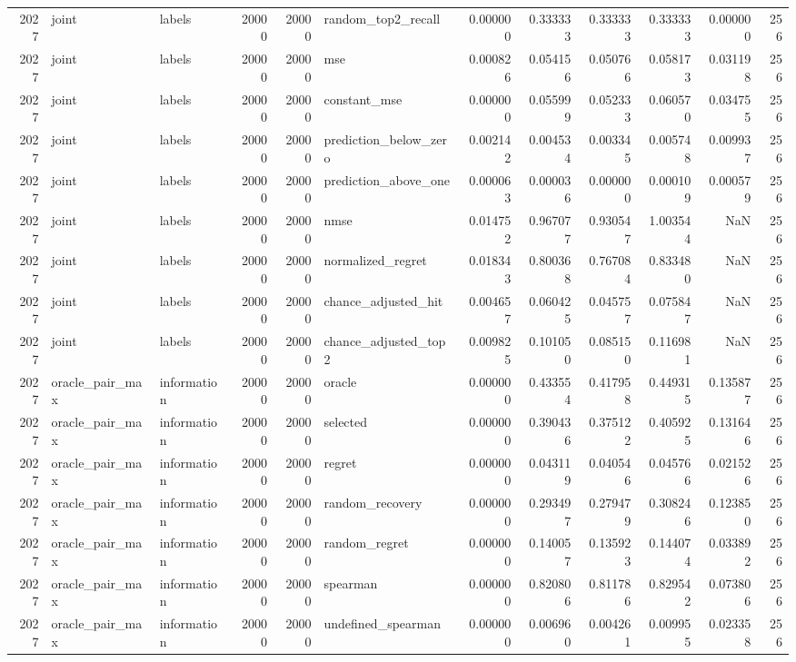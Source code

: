 \begin{tabular}{rllrrlrrrrrr}
2027 & joint & labels & 20000 & 20000 & random_top2_recall & 0.000000 & 0.333333 & 0.333333 & 0.333333 & 0.000000 & 256 \\
2027 & joint & labels & 20000 & 20000 & mse & 0.000826 & 0.054156 & 0.050766 & 0.058173 & 0.031198 & 256 \\
2027 & joint & labels & 20000 & 20000 & constant_mse & 0.000000 & 0.055999 & 0.052333 & 0.060570 & 0.034755 & 256 \\
2027 & joint & labels & 20000 & 20000 & prediction_below_zero & 0.002142 & 0.004534 & 0.003345 & 0.005748 & 0.009937 & 256 \\
2027 & joint & labels & 20000 & 20000 & prediction_above_one & 0.000063 & 0.000036 & 0.000000 & 0.000109 & 0.000579 & 256 \\
2027 & joint & labels & 20000 & 20000 & nmse & 0.014752 & 0.967077 & 0.930547 & 1.003544 & NaN & 256 \\
2027 & joint & labels & 20000 & 20000 & normalized_regret & 0.018343 & 0.800368 & 0.767084 & 0.833480 & NaN & 256 \\
2027 & joint & labels & 20000 & 20000 & chance_adjusted_hit & 0.004657 & 0.060425 & 0.045757 & 0.075847 & NaN & 256 \\
2027 & joint & labels & 20000 & 20000 & chance_adjusted_top2 & 0.009825 & 0.101050 & 0.085150 & 0.116981 & NaN & 256 \\
2027 & oracle_pair_max & information & 20000 & 20000 & oracle & 0.000000 & 0.433554 & 0.417958 & 0.449315 & 0.135877 & 256 \\
2027 & oracle_pair_max & information & 20000 & 20000 & selected & 0.000000 & 0.390436 & 0.375122 & 0.405925 & 0.131646 & 256 \\
2027 & oracle_pair_max & information & 20000 & 20000 & regret & 0.000000 & 0.043119 & 0.040546 & 0.045766 & 0.021526 & 256 \\
2027 & oracle_pair_max & information & 20000 & 20000 & random_recovery & 0.000000 & 0.293497 & 0.279479 & 0.308246 & 0.123850 & 256 \\
2027 & oracle_pair_max & information & 20000 & 20000 & random_regret & 0.000000 & 0.140057 & 0.135923 & 0.144074 & 0.033892 & 256 \\
2027 & oracle_pair_max & information & 20000 & 20000 & spearman & 0.000000 & 0.820806 & 0.811786 & 0.829542 & 0.073806 & 256 \\
2027 & oracle_pair_max & information & 20000 & 20000 & undefined_spearman & 0.000000 & 0.006960 & 0.004261 & 0.009955 & 0.023358 & 256 \\

\end{tabular}

